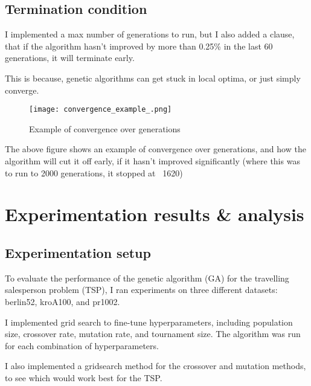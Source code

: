 \documentclass[11pt]{scrartcl} %
\begin{document}
\subsection{Termination condition}
I implemented a max number of generations to run, but I also added a clause, that if the algorithm hasn't improved by more than 0.25\% in the last 60 generations, it will terminate early.

This is because, genetic algorithms can get stuck in local optima, or just simply converge.

\begin{figure}[h!]
	\centering
	\texttt{[image: convergence\_example\_.png]}
	\caption{Example of convergence over generations}
	\label{fig:convergence_example}
\end{figure}

The above figure shows an example of convergence over generations, and how the algorithm will cut it off early, if it hasn't improved significantly (where this was to run to 2000 generations, it stopped at ~1620)

\section{Experimentation results \& analysis}

\subsection{Experimentation setup}
To evaluate the performance of the genetic algorithm (GA) for the travelling salesperson problem (TSP), I ran experiments on three different datasets: berlin52, kroA100, and pr1002.

I implemented grid search to fine-tune hyperparameters, including population size, crossover rate, mutation rate, and tournament size. The algorithm was run for each combination of hyperparameters.

I also implemented a gridsearch method for the crossover and mutation methods, to see which would work best for the TSP.
\end{document}
